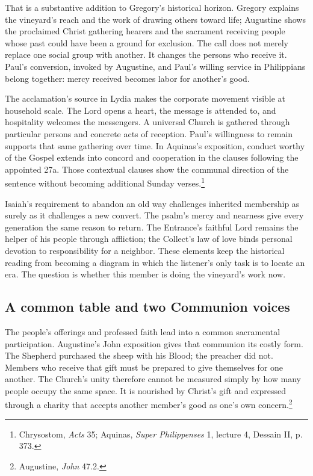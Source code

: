 That is a substantive addition to Gregory's historical horizon. Gregory explains the vineyard's reach and the work of drawing others toward life; Augustine shows the proclaimed Christ gathering hearers and the sacrament receiving people whose past could have been a ground for exclusion. The call does not merely replace one social group with another. It changes the persons who receive it. Paul's conversion, invoked by Augustine, and Paul's willing service in Philippians belong together: mercy received becomes labor for another's good.

The acclamation's source in Lydia makes the corporate movement visible at household scale. The Lord opens a heart, the message is attended to, and hospitality welcomes the messengers. A universal Church is gathered through particular persons and concrete acts of reception. Paul's willingness to remain supports that same gathering over time. In Aquinas's exposition, conduct worthy of the Gospel extends into concord and cooperation in the clauses following the appointed 27a. Those contextual clauses show the communal direction of the sentence without becoming additional Sunday verses.\footnote{Chrysostom, \textit{Acts} 35; Aquinas, \textit{Super Philippenses} 1, lecture 4, Dessain II, p. 373.}

Isaiah's requirement to abandon an old way challenges inherited membership as surely as it challenges a new convert. The psalm's mercy and nearness give every generation the same reason to return. The Entrance's faithful Lord remains the helper of his people through affliction; the Collect's law of love binds personal devotion to responsibility for a neighbor. These elements keep the historical reading from becoming a diagram in which the listener's only task is to locate an era. The question is whether this member is doing the vineyard's work now.

\subsection{A common table and two Communion voices}
The people's offerings and professed faith lead into a common sacramental participation. Augustine's John exposition gives that communion its costly form. The Shepherd purchased the sheep with his Blood; the preacher did not. Members who receive that gift must be prepared to give themselves for one another. The Church's unity therefore cannot be measured simply by how many people occupy the same space. It is nourished by Christ's gift and expressed through a charity that accepts another member's good as one's own concern.\footnote{Augustine, \textit{John} 47.2.}

